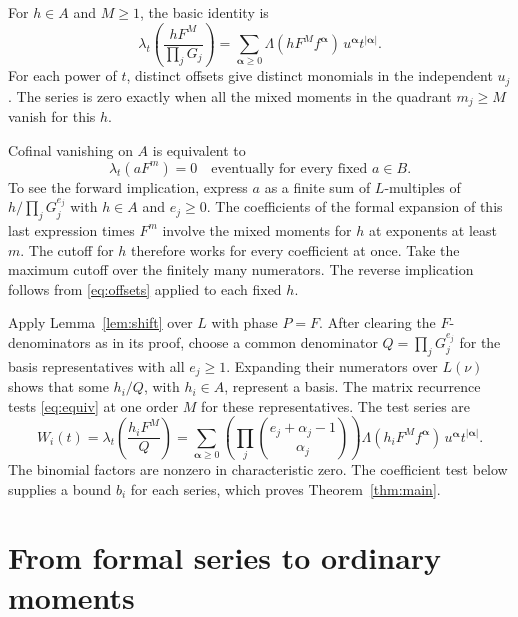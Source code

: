 \documentclass[11pt]{article}
\begin{document}
For \(h\in A\) and \(M\ge1\), the basic identity is
\begin{equation}\label{eq:offsets}
 \lambda_t\left(\frac{hF^M}{\prod_jG_j}\right)
 =\sum_{\boldsymbol\alpha\ge0}
    \Lambda(hF^M f^{\boldsymbol\alpha})\,
    u^{\boldsymbol\alpha}t^{|\boldsymbol\alpha|}.
\end{equation}
For each power of \(t\), distinct offsets give distinct monomials in
the independent \(u_j\). The series is zero exactly when all the
mixed moments in the quadrant \(m_j\ge M\) vanish for this \(h\).

Cofinal vanishing on \(A\) is equivalent to
\begin{equation}\label{eq:equiv}
       \lambda_t(aF^m)=0\quad\text{eventually for every fixed \(a\in B\)}.
\end{equation}
To see the forward implication, express \(a\) as a finite sum of
\(L\)-multiples of \(h/\prod_jG_j^{e_j}\) with \(h\in A\) and
\(e_j\ge0\). The coefficients of the formal expansion of this last
expression times \(F^m\) involve the mixed moments for \(h\) at
exponents at least \(m\). The cutoff for \(h\) therefore works for
every coefficient at once. Take the maximum cutoff over the finitely
many numerators. The reverse implication follows from
\eqref{eq:offsets} applied to each fixed \(h\).

Apply Lemma~\ref{lem:shift} over \(L\) with phase \(P=F\).
After clearing the \(F\)-denominators as in its proof, choose a common
denominator \(Q=\prod_j G_j^{e_j}\) for the basis representatives
with all \(e_j\ge1\). Expanding their numerators over \(L(\nu)\)
shows that some \(h_i/Q\), with \(h_i\in A\), represent a basis.
The matrix recurrence tests \eqref{eq:equiv} at one order \(M\)
for these representatives. The test series are
\begin{equation}\label{eq:weighted-offsets}
 W_i(t)=\lambda_t\left(\frac{h_i F^M}{Q}\right)
   =\sum_{\boldsymbol\alpha\ge0}
     \left(\prod_j\binom{e_j+\alpha_j-1}{\alpha_j}\right)
     \Lambda(h_i F^M f^{\boldsymbol\alpha})\,
     u^{\boldsymbol\alpha}t^{|\boldsymbol\alpha|}.
\end{equation}
The binomial factors are nonzero in characteristic zero. The
coefficient test below supplies a bound \(b_i\) for each series,
which proves Theorem~\ref{thm:main}.

\section{From formal series to ordinary moments}\label{sec:jets}
\end{document}

